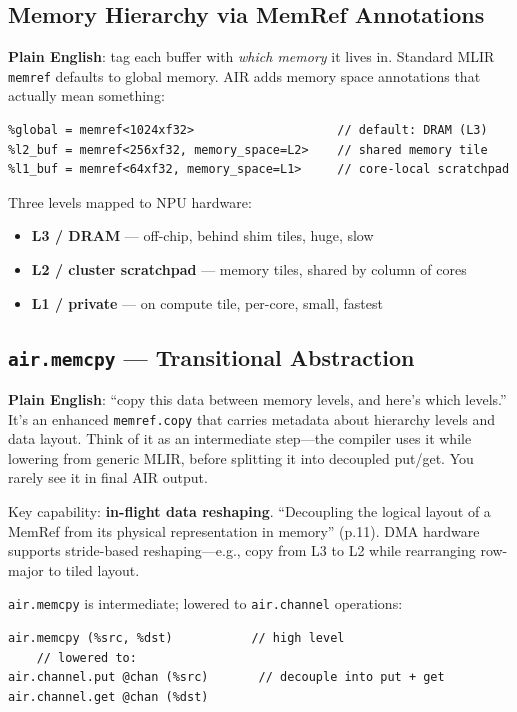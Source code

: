 \documentclass[11pt,a4paper]{article}
\begin{document}
\subsection{Memory Hierarchy via MemRef Annotations}

\textbf{Plain English}: tag each buffer with \emph{which memory} it lives in.
Standard MLIR \texttt{memref} defaults to global memory. AIR adds memory space
annotations that actually mean something:

\begin{lstlisting}
%global = memref<1024xf32>                    // default: DRAM (L3)
%l2_buf = memref<256xf32, memory_space=L2>    // shared memory tile
%l1_buf = memref<64xf32, memory_space=L1>     // core-local scratchpad
\end{lstlisting}

Three levels mapped to NPU hardware:
\begin{itemize}[leftmargin=2em]
  \item \textbf{L3 / DRAM} --- off-chip, behind shim tiles, huge, slow
  \item \textbf{L2 / cluster scratchpad} --- memory tiles, shared by column of cores
  \item \textbf{L1 / private} --- on compute tile, per-core, small, fastest
\end{itemize}

\subsection{\texttt{air.memcpy} --- Transitional Abstraction}

\textbf{Plain English}: ``copy this data between memory levels, and here's which
levels.'' It's an enhanced \texttt{memref.copy} that carries metadata about
hierarchy levels and data layout. Think of it as an intermediate step---the compiler
uses it while lowering from generic MLIR, before splitting it into decoupled
put/get. You rarely see it in final AIR output.

Key capability: \textbf{in-flight data reshaping}. ``Decoupling the logical layout of
a MemRef from its physical representation in memory'' (p.11). DMA hardware supports
stride-based reshaping---e.g., copy from L3 to L2 while rearranging row-major to
tiled layout.

\texttt{air.memcpy} is intermediate; lowered to \texttt{air.channel} operations:
\begin{lstlisting}
air.memcpy (%src, %dst)           // high level
    // lowered to:
air.channel.put @chan (%src)       // decouple into put + get
air.channel.get @chan (%dst)
\end{lstlisting}
\end{document}

